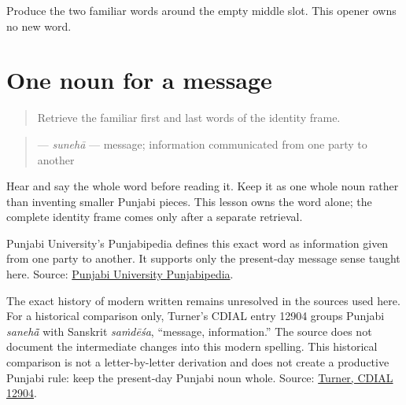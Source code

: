 \begin{tcolorbox}[breakable,colback=teal!4,colframe=teal!35!black,title={Before you move on}]
Produce the two familiar words around the empty middle slot. This opener owns no new word.
\end{tcolorbox}
\section[\texorpdfstring{\pa{ਸੁਨੇਹਾ} (sunehaa)}{ਸੁਨੇਹਾ (sunehaa)}]{One noun for a message}

\label{lesson:PA-C198-suneha}



\begin{quote}
Retrieve the familiar first and last words of the identity frame.
\end{quote}

\begin{grammarlens}[title={Grammar Lens: direct owner}]
\begin{quote}
\textbf{} — \emph{sunehā} — message; information communicated from one party to another
\end{quote}

Hear and say the whole word before reading it. Keep it as one whole noun rather than inventing smaller Punjabi pieces. This lesson owns the word alone; the complete identity frame comes only after a separate retrieval.
\end{grammarlens}

\begin{cousinweb}
Punjabi University's Punjabipedia defines this exact word as information given from one party to another. It supports only the present-day message sense taught here. Source: \href{https://punjabipedia.org/topic.aspx?txt=\%E0\%A8\%B8\%E0\%A9\%81\%E0\%A8\%A8\%E0\%A9\%87\%E0\%A8\%B9\%E0\%A8\%BE}{Punjabi University Punjabipedia}.

The exact history of modern written \textbf{} remains unresolved in the sources used here. For a historical comparison only, Turner's CDIAL entry 12904 groups Punjabi \emph{sanehā̃} with Sanskrit \emph{saṁdēśa}, “message, information.” The source does not document the intermediate changes into this modern spelling. This historical comparison is not a letter-by-letter derivation and does not create a productive Punjabi rule: keep the present-day Punjabi noun whole. Source: \href{https://dsal.uchicago.edu/cgi-bin/app/soas\_query.py?qs=sa\%E1\%B9\%81d\%C4\%93\%C5\%9Ba\&searchhws=yes\&matchtype=exact}{Turner, CDIAL 12904}.
\end{cousinweb}

